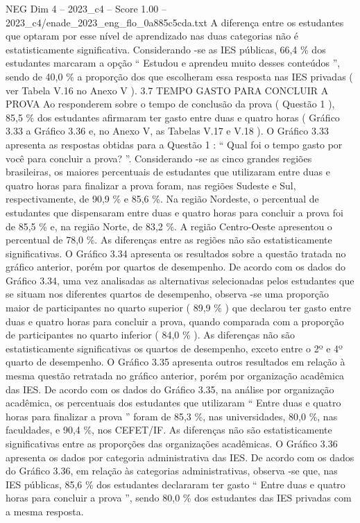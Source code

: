 \begin{textsample}{NEG Dim 4 – 2023\_c4 – Score 1.00 – 2023\_c4/enade\_2023\_eng\_flo\_0a885c5cda.txt}
A diferença entre os estudantes que optaram por esse nível de aprendizado nas duas categorias não é estatisticamente significativa.
Considerando -se as IES públicas, 66,4 \% dos estudantes marcaram a opção “ Estudou e aprendeu muito desses conteúdos ”, sendo de 40,0 \% a proporção dos que escolheram essa resposta nas IES privadas ( ver Tabela V.16 no Anexo V ). 3.7 TEMPO GASTO PARA CONCLUIR A PROVA Ao responderem sobre o tempo de conclusão da prova ( Questão 1 ), 85,5 \% dos estudantes afirmaram ter gasto entre duas e quatro horas ( Gráfico 3.33 a Gráfico 3.36 e, no Anexo V, as Tabelas V.17 e V.18 ).
O Gráfico 3.33 apresenta as respostas obtidas para a Questão 1 : “ Qual foi o tempo gasto por você para concluir a prova? ”.
Considerando -se as cinco grandes regiões brasileiras, os maiores percentuais de estudantes que utilizaram entre duas e quatro horas para finalizar a prova foram, nas regiões Sudeste e Sul, respectivamente, de 90,9 \% e 85,6 \%.
Na região Nordeste, o percentual de estudantes que dispensaram entre duas e quatro horas para concluir a prova foi de 85,5 \% e, na região Norte, de 83,2 \%.
A região Centro-Oeste apresentou o percentual de 78,0 \%.
As diferenças entre as regiões não são estatisticamente significativas.
O Gráfico 3.34 apresenta os resultados sobre a questão tratada no gráfico anterior, porém por quartos de desempenho.
De acordo com os dados do Gráfico 3.34, uma vez analisadas as alternativas selecionadas pelos estudantes que se situam nos diferentes quartos de desempenho, observa -se uma proporção maior de participantes no quarto superior ( 89,9 \% ) que declarou ter gasto entre duas e quatro horas para concluir a prova, quando comparada com a proporção de participantes no quarto inferior ( 84,0 \% ).
As diferenças não são estatisticamente significativas os quartos de desempenho, exceto entre o 2º e 4º quarto de desempenho.
O Gráfico 3.35 apresenta outros resultados em relação à mesma questão retratada no gráfico anterior, porém por organização acadêmica das IES.
De acordo com os dados do Gráfico 3.35, na análise por organização acadêmica, os percentuais dos estudantes que utilizaram “ Entre duas e quatro horas para finalizar a prova ” foram de 85,3 \%, nas universidades, 80,0 \%, nas faculdades, e 90,4 \%, nos CEFET/IF.
As diferenças não são estatisticamente significativas entre as proporções das organizações acadêmicas.
O Gráfico 3.36 apresenta os dados por categoria administrativa das IES.
De acordo com os dados do Gráfico 3.36, em relação às categorias administrativas, observa -se que, nas IES públicas, 85,6 \% dos estudantes declararam ter gasto “ Entre duas e quatro horas para concluir a prova ”, sendo 80,0 \% dos estudantes das IES privadas com a mesma resposta.

\end{textsample}
